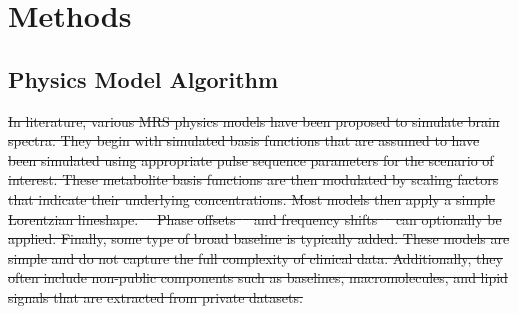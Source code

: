 \documentclass[AMA,LATO1COL]{WileyNJD-v2}
\providecommand{\DIFdel}[1]{{\protect\color{red}\sout{#1}}}                      %
\providecommand{\DIFaddend}{} %
\providecommand{\DIFdelbegin}{} %
\providecommand{\DIFdelend}{} %
\begin{document}


\DIFaddend \section{Methods}\label{sec:Methods}
\subsection{Physics Model Algorithm}
\DIFdelbegin \DIFdel{In literature, various MRS physics models have been proposed to simulate brain spectra. They begin with simulated basis functions that are assumed to have been simulated using appropriate pulse sequence parameters for the scenario of interest. These metabolite basis functions are then modulated by scaling factors that indicate their underlying concentrations. Most models then apply a simple Lorentzian lineshape.\mbox{%
\cite{Hatami, Das2018a, Das2018} }\hspace{0pt}%
Phase offsets\mbox{%
\cite{Das2018,Iqbal2018a} }\hspace{0pt}%
and frequency shifts\mbox{%
\cite{Hatami} }\hspace{0pt}%
can optionally be applied. Finally, some type of broad baseline is typically added. These models are simple and do not capture the full complexity of clinical data. Additionally, they often include non-public components such as baselines, macromolecules, and lipid signals that are extracted from private datasets. 
}\DIFdelend %
\end{document}
